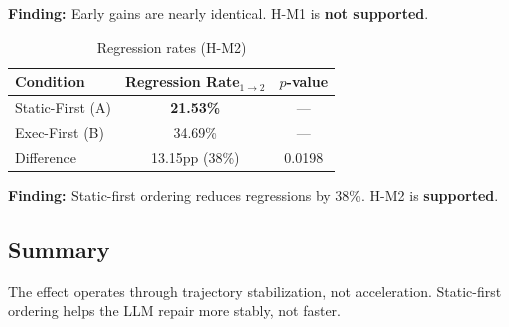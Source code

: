 \textbf{Finding:} Early gains are nearly identical. H-M1 is \textbf{not supported}.

\begin{table}[h]
\centering
\caption{Regression rates (H-M2)}
\label{tab:regression}
\begin{tabular}{@{}lcc@{}}
\toprule
Condition & Regression Rate$_{1\rightarrow2}$ & $p$-value \\
\midrule
Static-First (A) & \textbf{21.53\%} & --- \\
Exec-First (B) & 34.69\% & --- \\
\midrule
Difference & 13.15pp (38\%) & 0.0198 \\
\bottomrule
\end{tabular}
\end{table}

\textbf{Finding:} Static-first ordering reduces regressions by 38\%. H-M2 is \textbf{supported}.

\subsection{Summary}

The effect operates through trajectory stabilization, not acceleration. Static-first ordering helps the LLM repair more stably, not faster.

